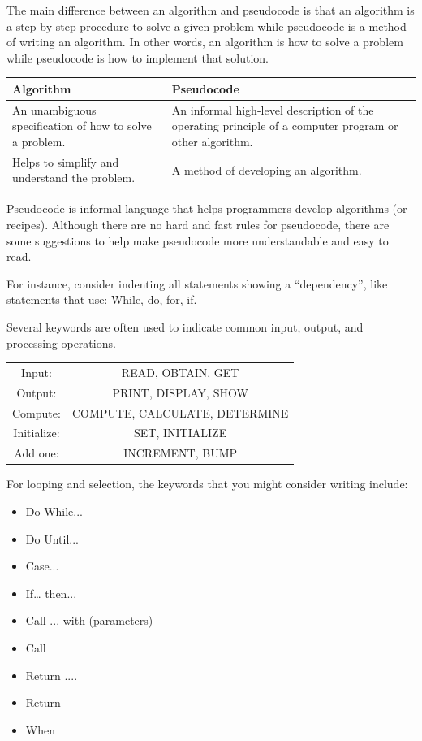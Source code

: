 The main difference between an algorithm and pseudocode is that an algorithm is a step by step procedure to solve a given problem while pseudocode is a method of writing an algorithm. In other words, an algorithm is how to solve a problem while pseudocode is how to implement that solution. 

\begin{table}[H]
    \centering
    \begin{tabular}{p{3 in}|p{3 in}} \hline 
    Algorithm 	& Pseudocode \\ \hline
An unambiguous specification of how to solve a problem. & An informal high-level description of the operating principle of a computer program or other algorithm. \\ \hline
Helps to simplify and understand the problem. & A method of developing an algorithm. \\\hline
    \end{tabular}
\end{table}

Pseudocode is informal language that helps programmers develop algorithms (or recipes). Although there are no hard and fast rules for pseudocode, there are some suggestions to help make pseudocode more understandable and easy to read.

For instance, consider indenting all statements showing a ``dependency”, like statements that use: While, do, for, if.

Several keywords are often used to indicate common input, output, and processing operations.

\begin{table}[H]
    \centering
    \begin{tabular}{c|c}
    Input:	& READ, OBTAIN, GET \\
    Output:	& PRINT, DISPLAY, SHOW \\
    Compute: & COMPUTE, CALCULATE, DETERMINE \\
    Initialize:	& SET, INITIALIZE \\
    Add one: & INCREMENT, BUMP \\
    \end{tabular}
\end{table}

For looping and selection, the keywords that you might consider writing include:
\begin{itemize}
    \item Do While...
    \item Do Until...
    \item Case...
    \item If… then...
    \item Call ... with (parameters)
    \item Call
    \item Return ....
    \item Return
    \item When
\end{itemize}

